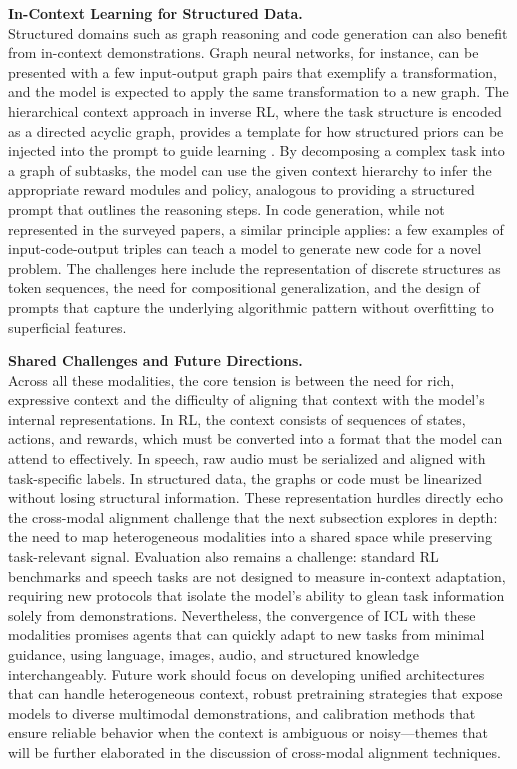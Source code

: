 \documentclass[11pt]{article}
\begin{document}
\textbf{In-Context Learning for Structured Data.}\\
Structured domains such as graph reasoning and code generation can also benefit from in-context demonstrations. Graph neural networks, for instance, can be presented with a few input-output graph pairs that exemplify a transformation, and the model is expected to apply the same transformation to a new graph. The hierarchical context approach in inverse RL, where the task structure is encoded as a directed acyclic graph, provides a template for how structured priors can be injected into the prompt to guide learning \cite{ref152}. By decomposing a complex task into a graph of subtasks, the model can use the given context hierarchy to infer the appropriate reward modules and policy, analogous to providing a structured prompt that outlines the reasoning steps. In code generation, while not represented in the surveyed papers, a similar principle applies: a few examples of input-code-output triples can teach a model to generate new code for a novel problem. The challenges here include the representation of discrete structures as token sequences, the need for compositional generalization, and the design of prompts that capture the underlying algorithmic pattern without overfitting to superficial features.

\textbf{Shared Challenges and Future Directions.}\\
Across all these modalities, the core tension is between the need for rich, expressive context and the difficulty of aligning that context with the model's internal representations. In RL, the context consists of sequences of states, actions, and rewards, which must be converted into a format that the model can attend to effectively. In speech, raw audio must be serialized and aligned with task-specific labels. In structured data, the graphs or code must be linearized without losing structural information. These representation hurdles directly echo the cross-modal alignment challenge that the next subsection explores in depth: the need to map heterogeneous modalities into a shared space while preserving task-relevant signal. Evaluation also remains a challenge: standard RL benchmarks and speech tasks are not designed to measure in-context adaptation, requiring new protocols that isolate the model's ability to glean task information solely from demonstrations. Nevertheless, the convergence of ICL with these modalities promises agents that can quickly adapt to new tasks from minimal guidance, using language, images, audio, and structured knowledge interchangeably. Future work should focus on developing unified architectures that can handle heterogeneous context, robust pretraining strategies that expose models to diverse multimodal demonstrations, and calibration methods that ensure reliable behavior when the context is ambiguous or noisy---themes that will be further elaborated in the discussion of cross-modal alignment techniques.
\end{document}
